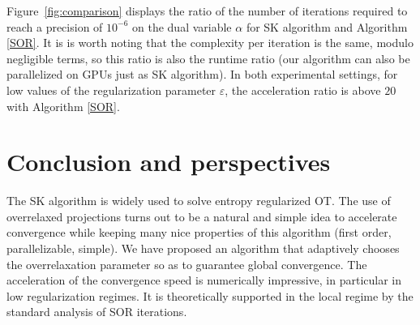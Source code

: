 \documentclass{article} %
\DeclareMathOperator{\IR}{\mathbb{R}}
\DeclareMathOperator{\diag}{diag}
\renewcommand{\epsilon}{\varepsilon}
\theoremstyle{plain}
\theoremstyle{definition}
\theoremstyle{remark}
\begin{document}
Figure~\ref{fig:comparison} displays the ratio of the number of iterations required to reach a precision of $10^{-6}$ on the dual variable $\alpha$ for SK algorithm and Algorithm \ref{SOR}. It is is worth noting that the complexity per iteration is the same, modulo negligible terms, so this ratio is also the runtime ratio (our algorithm can also be parallelized on GPUs just as SK algorithm). In both experimental settings, for low values of the regularization parameter $\epsilon$, the acceleration ratio is above $20$  with Algorithm \ref{SOR}.







\section{Conclusion and perspectives}
The SK algorithm is widely used to solve entropy regularized OT.
The use of overrelaxed projections turns out to be a natural and simple idea to accelerate convergence while keeping many nice properties of this algorithm (first order, parallelizable, simple).
We have proposed an algorithm that adaptively chooses the overrelaxation parameter so as to guarantee global convergence.
The acceleration of the convergence speed is numerically impressive, in particular in low regularization regimes.
It is theoretically supported in the local regime by the standard analysis of SOR iterations.
\end{document}
